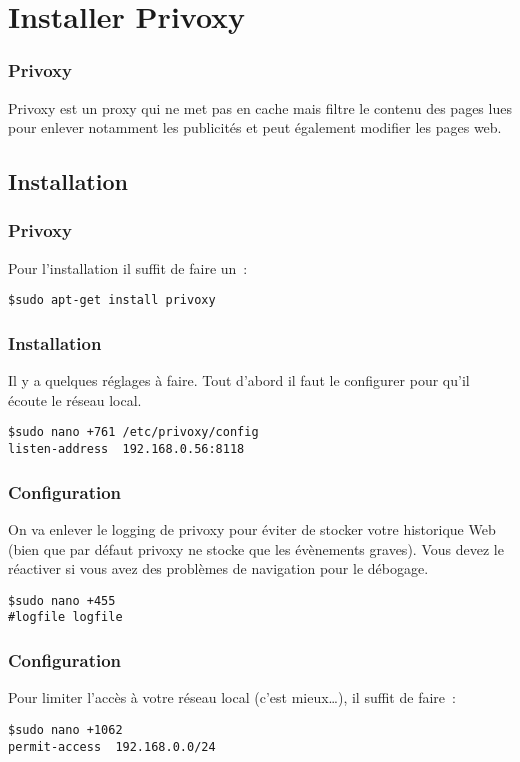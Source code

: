 \section{Installer Privoxy}

\begin{frame}[containsverbatim]
\frametitle{Privoxy}
Privoxy est un proxy qui ne met pas en cache mais filtre le contenu des pages lues pour enlever notamment les publicités et peut également modifier les pages web.

\end{frame}

\subsection{Installation}

\begin{frame}[containsverbatim]
\frametitle{Privoxy}

Pour l'installation il suffit de faire un~:
\begin{verbatim}
$sudo apt-get install privoxy
\end{verbatim}

\end{frame}

\begin{frame}[containsverbatim]
\frametitle{Installation}

Il y a quelques réglages à faire. Tout d'abord il faut le configurer pour qu'il écoute le réseau local.

\begin{verbatim}
$sudo nano +761 /etc/privoxy/config
listen-address  192.168.0.56:8118
\end{verbatim}

\end{frame}

\begin{frame}[containsverbatim]
\frametitle{Configuration}

On va enlever le logging de privoxy pour éviter de stocker votre historique Web (bien que par défaut privoxy ne stocke que les évènements graves). Vous devez le réactiver si vous avez des problèmes de navigation pour le débogage.

\begin{verbatim}
$sudo nano +455
#logfile logfile
\end{verbatim}

\end{frame}

\begin{frame}[containsverbatim]
\frametitle{Configuration}

Pour limiter l'accès à votre réseau local (c'est mieux\dots), il suffit de faire~:
\begin{verbatim}
$sudo nano +1062
permit-access  192.168.0.0/24
\end{verbatim}

\end{frame}

